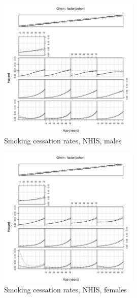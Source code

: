 \documentclass[11pt,a4paper]{article}
\begin{document}
\begin{figure}[h]
  \centering
  \includegraphics[width=0.6\textwidth]{coplot-3.pdf}    
  \caption{Smoking cessation rates, NHIS, males}
  \label{fig:init-males}
\end{figure}
\begin{figure}[h]
  \centering
  \includegraphics[width=0.6\textwidth]{coplot-4.pdf}    
  \caption{Smoking cessation rates, NHIS, females}
  \label{fig:init-males}
\end{figure}




\end{document}
